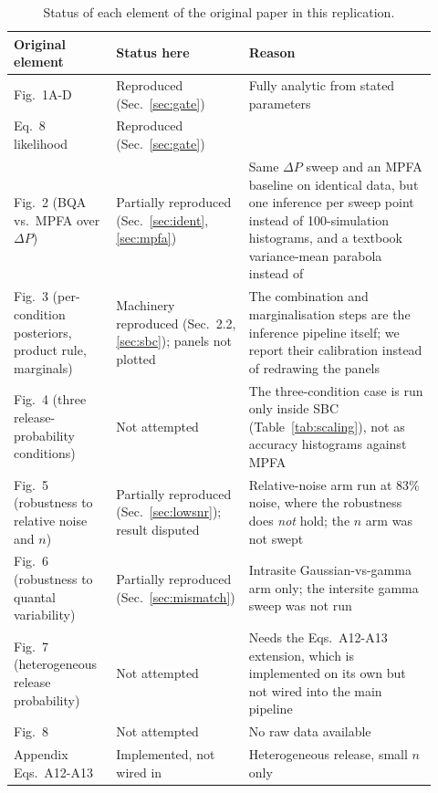 \documentclass[a4paper, oneside, 10pt]{article}
\renewcommand{\citet}[1]{\citeauthor{#1}\supercite{#1}}
\begin{document}
\begin{table}[!htb]
\centering
\caption{Status of each element of the original paper in this replication.}
\label{tab:scope}
\small
\begin{tabular}{@{}>{\raggedright\arraybackslash}p{0.24\linewidth}
>{\raggedright\arraybackslash}p{0.24\linewidth}
>{\raggedright\arraybackslash}p{0.44\linewidth}@{}}
\toprule
Original element & Status here & Reason \\
\midrule
Fig.~1A-D & Reproduced (Sec.~\ref{sec:gate}) & Fully analytic from stated parameters \\
Eq.~8 likelihood & Reproduced (Sec.~\ref{sec:gate}) & \\
Fig.~2 (BQA vs.\ MPFA over \(\Delta P\)) & Partially reproduced (Sec.~\ref{sec:ident}, \ref{sec:mpfa}) & Same \(\Delta P\) sweep and an MPFA baseline on identical data, but one inference per sweep point instead of 100-simulation histograms, and a textbook variance-mean parabola instead of \citet{silver2003} \\
Fig.~3 (per-condition posteriors, product rule, marginals) & Machinery reproduced (Sec.~2.2, \ref{sec:sbc}); panels not plotted & The combination and marginalisation steps are the inference pipeline itself; we report their calibration instead of redrawing the panels \\
Fig.~4 (three release-probability conditions) & Not attempted & The three-condition case is run only inside SBC (Table~\ref{tab:scaling}), not as accuracy histograms against MPFA \\
Fig.~5 (robustness to relative noise and \(n\)) & Partially reproduced (Sec.~\ref{sec:lowsnr}); result disputed & Relative-noise arm run at 83\% noise, where the robustness does \emph{not} hold; the \(n\) arm was not swept \\
Fig.~6 (robustness to quantal variability) & Partially reproduced (Sec.~\ref{sec:mismatch}) & Intrasite Gaussian-vs-gamma arm only; the intersite gamma sweep was not run \\
Fig.~7 (heterogeneous release probability) & Not attempted & Needs the Eqs.~A12-A13 extension, which is implemented on its own but not wired into the main pipeline \\
Fig.~8 & Not attempted & No raw data available \\
Appendix Eqs.~A12-A13 & Implemented, not wired in & Heterogeneous release, small \(n\) only \\
\bottomrule
\end{tabular}
\end{table}
\end{document}
